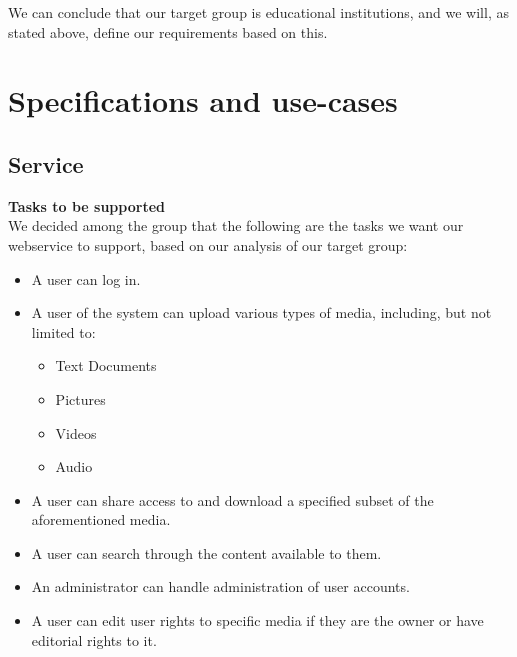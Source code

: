 \documentclass[10pt,a4paper]{article}
\begin{document}
We can conclude that our target group is educational institutions, and we will, as stated above, define our requirements based on this.

\section{Specifications and use-cases}
\subsection{Service}
{\bfseries Tasks to be supported}\\
We decided among the group that the following are the tasks we want our webservice to support, based on our analysis of our target group:
\begin{itemize}
\item A user can log in.
\item A user of the system can upload various types of media, including, but not limited to:
\begin{itemize}
\item Text Documents
\item Pictures
\item Videos
\item Audio
\end{itemize}
\item A user can share access to and download a specified subset of the aforementioned  media.
\item A user can search through the content available to them.

\item An administrator can handle administration of user accounts.
\item A user can edit user rights to specific media if they are the owner or have editorial rights to it.
\end{itemize}
\end{document}
